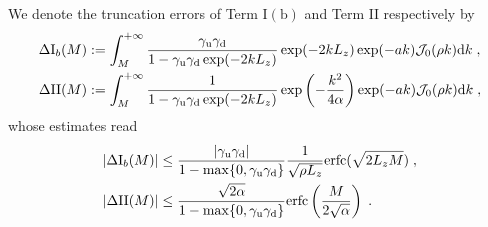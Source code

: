 \begin{prop}
We denote the     truncation errors of Term $\mathrm{I(b)}$ and Term $\mathrm{II}$ respectively by
\begin{align*}
  \Delta \mathrm{I}_b(M)&:=\int_M^{+\infty} \frac{\gamma_{\mathrm{u}}\gamma_{\mathrm{d}}}{1-\gamma_{\mathrm{u}}\gamma_{\mathrm{d}}\exp(-2kL_z)}  \exp(-2kL_z)\exp(-ak) \mathcal{J}_0(\rho k)\mathrm{d} k \;,\\  
  \Delta \mathrm{II}(M)&:=\int_M^{+\infty}  \frac{1}{1-\gamma_{\mathrm{u}}\gamma_{\mathrm{d}}\exp(-2kL_z)}\exp\left(-\frac{k^2}{4\alpha}\right)  \exp(-ak) \mathcal{J}_0(\rho k)\mathrm{d} k \;,
\end{align*}
whose estimates read
\begin{align}
    \left\lvert\Delta \mathrm{I}_b(M)\right\rvert &\leq  \frac{\left\lvert\gamma_{\mathrm{u}}\gamma_{\mathrm{d}}\right\rvert}{1-\max\{0,\gamma_{\mathrm{u}}\gamma_{\mathrm{d}}\}}\frac{1}{\sqrt{\rho L_z}}\mathrm{erfc}(\sqrt{2L_zM})\;,\\
    \left\lvert\Delta \mathrm{II}(M)\right\rvert &\leq \frac{\sqrt{2\alpha} }{1-\max\{0,\gamma_{\mathrm{u}}\gamma_{\mathrm{d}}\}} \mathrm{erfc}\left(\frac{M}{2\sqrt{\alpha}}\right)\;.
\end{align}
\end{prop}
